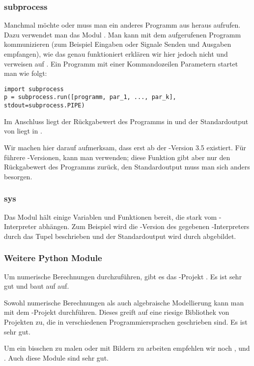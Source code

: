 \subsubsection{subprocess}
\label{section:module:empfohlene_module:subprocess}
Manchmal möchte oder muss man ein anderes Programm aus \Python heraus aufrufen.
Dazu verwendet man das Modul .
Man kann mit dem aufgerufenen Programm kommunizieren (zum Beispiel Eingaben oder Signale Senden und Ausgaben empfangen),
wie das genau funktioniert erklären wir hier jedoch nicht und verweisen auf \cite[Library, Concurrent Execution, Subprocess management]{Python3}.
Ein Programm  mit einer Kommandozeilen Parametern  startet man wie folgt:
\begin{lstlisting}
import subprocess
p = subprocess.run([programm, par_1, ..., par_k], stdout=subprocess.PIPE)
\end{lstlisting}
Im Anschluss liegt der Rückgabewert des Programms  in  und der Standardoutput von  liegt in .

Wir machen hier darauf aufmerksam, dass  erst ab der \Python-Version 3.5 existiert.
Für führere \Python-Versionen, kann man  verwenden; diese Funktion gibt aber nur den Rückgabewert des Programms zurück, den Standardoutput muss man sich anders besorgen.


\subsubsection{sys}
\label{section:module:empfohlene_module:sys}
Das Modul  hält einige Variablen und Funktionen bereit, die stark vom \Python-Interpreter abhängen.
Zum Beispiel wird die \Python-Version des gegebenen \Python-Interpreters durch das Tupel  beschrieben und der Standardoutput wird durch  abgebildet.


\subsubsection{Weitere Python Module}
\label{section:module:empfohlene_module:rest}
Um numerische Berechnungen durchzuführen, gibt es das \Python-Projekt .
Es ist sehr gut und baut auf  auf.

Sowohl numerische Berechnungen als auch algebraische Modellierung kann man mit dem \Python-Projekt  durchführen.
Dieses greift auf eine riesige Bibliothek von Projekten zu, die in verschiedenen Programmiersprachen geschrieben sind.
Es ist sehr gut.

Um ein bisschen zu malen oder mit Bildern zu arbeiten empfehlen wir noch ,  und .
Auch diese Module sind sehr gut.

